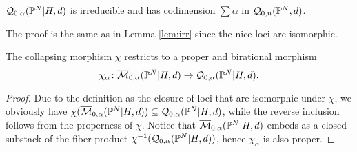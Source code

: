 \begin{lem}
 $\mathcal{Q}_{0,\alpha}(\mathbb P^N|H,d)$ is irreducible and has codimension $\sum\alpha$ in $\mathcal{Q}_{0,n}(\mathbb P^N,d)$.
\end{lem}
The proof is the same as in Lemma \ref{lem:irr} since the nice loci are isomorphic.

\begin{lem}
 The collapsing morphism $\chi$ restricts to a proper and birational morphism \[\chi_\alpha\colon \overline{\mathcal{M}}_{0,\alpha}(\mathbb P^N|H,d)\rightarrow \mathcal{Q}_{0,\alpha}(\mathbb P^N|H,d).\]
\end{lem}
\begin{proof}
 Due to the definition as the closure of loci that are isomorphic under $\chi$, we obviously have $\chi(\overline{\mathcal{M}}_{0,\alpha}(\mathbb P^N|H,d))\subseteq \mathcal{Q}_{0,\alpha}(\mathbb P^N|H,d)$, while the reverse inclusion follows from the properness of $\chi$. Notice that $\overline{\mathcal{M}}_{0,\alpha}(\mathbb P^N|H,d)$ embeds as a closed substack of the fiber product $\chi^{-1}(\mathcal{Q}_{0,\alpha}(\mathbb P^N|H,d))$, hence $\chi_\alpha$ is also proper.
\end{proof}

